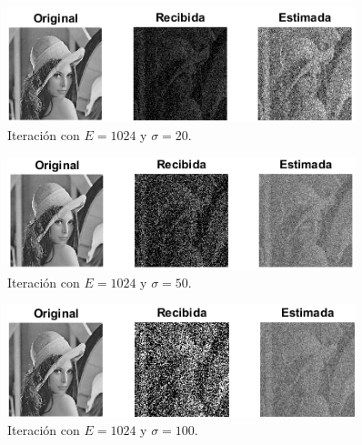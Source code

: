 \documentclass[a4paper]{article}
\begin{document}
\begin{itemize}
	\begin{figure}[H]
		\centering
		\includegraphics[width=0.9\textwidth]{E1024S20.png}
		\caption{Iteración con $ E = 1024 $ y $ \sigma = 20 $.}
	\end{figure}
	\begin{figure}[H]
		\centering
		\includegraphics[width=0.9\textwidth]{E1024S50.png}
		\caption{Iteración con $ E = 1024 $ y $ \sigma = 50 $.}
	\end{figure}
	\begin{figure}[H]
		\centering
		\includegraphics[width=0.9\textwidth]{E1024S100.png}
		\caption{Iteración con $ E = 1024 $ y $ \sigma = 100 $.}
	\end{figure}
		
\end{itemize}
\end{document}
